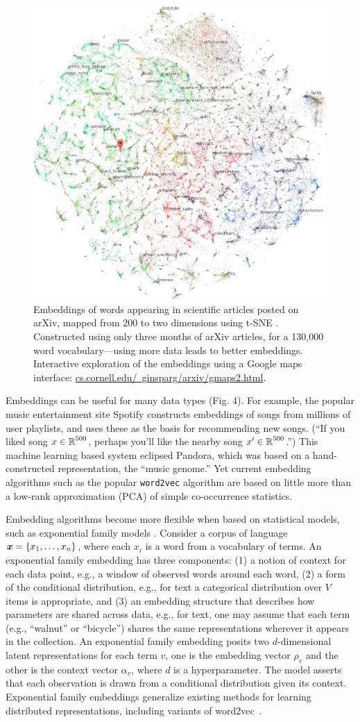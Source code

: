 \setlength{\columnsep}{20pt}
\begin{figure}
\centering
\includegraphics[width=.44\textwidth]{figs/ginsparg}
\caption{\small Embeddings of words appearing in scientific articles
posted on arXiv, mapped from 200 to two dimensions using
t-SNE \citep{ginsparg}. Constructed using only three months of
arXiv articles, for a 130,000 word vocabulary---using more data
leads to better embeddings.
Interactive exploration of the embeddings
using a Google maps interface: \href{http://www.cs.cornell.edu/~ginsparg/arxiv/gmaps2.html}{cs.cornell.edu/~ginsparg/arxiv/gmaps2.html}.
}
    \label{fig:arxiv}
    \vskip-10pt
\end{figure}

Embeddings can be useful for many data types (Fig. 4). For example, the popular
music entertainment site Spotify constructs embeddings of songs from
millions of user playlists, and uses these as the basis for
recommending new songs.  (``If you liked song $x\in\mbox{$\mathbb{R}$}^{500}$,
perhaps you'll like the nearby song $x'\in\mbox{$\mathbb{R}$}^{500}$.'')  This
machine learning based system eclipsed Pandora, which was based on a
hand-constructed representation, the ``music genome.'' Yet current
embedding algorithms such as the popular \texttt{word2vec} algorithm
are based on little more than a low-rank approximation (PCA) of simple
co-occurrence statistics.

Embedding algorithms become more flexible when based
on statistical models, such as exponential family
models \citep{Rudolph:2016b,spherical}.
Consider a corpus of language $\boldsymbol{x} = \{x_1, \ldots, x_n\}$, where
each $x_i$ is a word from a vocabulary of terms. An exponential family
embedding has three components: (1) a notion of context for
each data point, e.g., a window of observed words around each word, (2)
a form of the conditional distribution, e.g., for text a
categorical distribution over $V$ items is appropriate, and (3) an
embedding structure that describes how parameters are shared
across data, e.g., for text, one may assume that each term (e.g.,
``walnut'' or ``bicycle'') shares the same representations wherever it
appears in the collection.
An exponential family embedding
posits two $d$-dimensional latent representations for each term $v$,
one is the embedding vector $\rho_v$ and the other is the
context vector $\alpha_v$, where $d$ is a hyperparameter. The
model asserts that each observation is drawn from a conditional
distribution given its context. 
Exponential family embeddings generalize existing methods for
learning distributed representations, including variants of word2vec~\citep{Mikolov:2013}.


